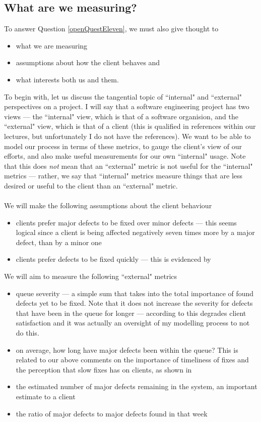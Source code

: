\subsection{What are we measuring?}

To answer Question \ref{openQuestEleven}, we must also give thought to 
\begin{itemize}
	\item what we are measuring
	\item assumptions about how the client behaves and
	\item what interests both us and them.
\end{itemize}

To begin with, let us discuss the tangential topic of ``internal" and ``external"
perspectives on a project.
I will say that a software engineering project has two views --- the ``internal" view, which is
that of a software organision, and the ``external" view, which is that of a
client (this is qualified in references within our lectures, but unfortunately I
    do not have the references).
We want to be able to model our process in terms of these metrics, to gauge the client's view of our
efforts, and also make useful measurements for our own ``internal" usage.
Note that this does {\em not} mean that an ``external" metric is not useful for the ``internal"
metrics --- rather, we say that ``internal" metrics measure things that are less desired or useful
to the client than an ``external" metric.\\
\\
We will make the following assumptions about the client behaviour
\begin{itemize}
	\item clients prefer major defects to be fixed over minor defects --- this seems logical since a
client is being affected negatively seven times more by a major defect, than by a minor one
	\item clients prefer defects to be fixed quickly --- this is evidenced by
  \cite{gaugingStakeholderPerc}
\end{itemize}

We will aim to measure the following ``external" metrics
\begin{itemize}
	\item queue severity --- a simple sum that takes into the total importance of found defects yet to
be fixed.
	Note that it does not increase the severity for defects that have been in the queue for longer ---
according to \cite{gaugingStakeholderPerc} this degrades client satisfaction and it was actually an oversight of my
modelling process to not do this.
	\item on average, how long have major defects been within the queue?
	This is related to our above comments on the importance of timeliness of fixes and the perception
that slow fixes has on clients, as shown in \cite{gaugingStakeholderPerc}
  \item the estimated number of major defects remaining in the system, an important estimate to a
client
	\item the ratio of major defects to major defects found in that week
\end{itemize}

